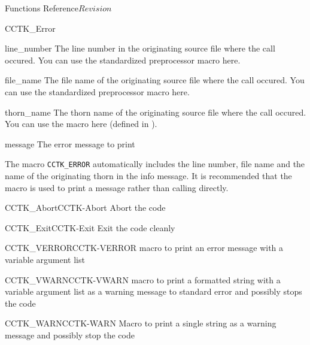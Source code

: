 \begin{cactuspart}{ Functions Reference}{}{$Revision$}
\begin{FunctionDescription}{CCTK\_Error}
\begin{ParameterSection}
\begin{Parameter}{line\_number}
The line number in the originating source file where the  call
occured. You can use the standardized  preprocessor macro here.
\end{Parameter}
\begin{Parameter}{file\_name}
The file name of the originating source file where the  call
occured. You can use the standardized  preprocessor macro here.
\end{Parameter}
\begin{Parameter}{thorn\_name}
The thorn name of the originating source file where the  call occured. You can use the  macro here (defined in ).
\end{Parameter}
\begin{Parameter}{message}
The error message to print
\end{Parameter}
\end{ParameterSection}

\begin{Discussion}
The macro \verb|CCTK_ERROR| automatically includes the line number, file name
and the name of the originating thorn in the
info message. It is recommended that the macro  is used
to print a message rather than calling  directly.
\end{Discussion}

\begin{SeeAlsoSection}
\begin{SeeAlso2}{CCTK\_Abort}{CCTK-Abort}
Abort the code
\end{SeeAlso2}
\begin{SeeAlso2}{CCTK\_Exit}{CCTK-Exit}
Exit the code cleanly
\end{SeeAlso2}
\begin{SeeAlso2}{CCTK\_VERROR}{CCTK-VERROR}
macro to print an error message with a variable argument list
\end{SeeAlso2}
\begin{SeeAlso2}{CCTK\_VWARN}{CCTK-VWARN}
macro to print a formatted string with a variable argument list as a warning
message to standard error and possibly stops the code
\end{SeeAlso2}
\begin{SeeAlso2}{CCTK\_WARN}{CCTK-WARN}
Macro to print a single string as a warning message and possibly stop the code
\end{SeeAlso2}
\end{SeeAlsoSection}
\end{FunctionDescription}


\end{cactuspart}
